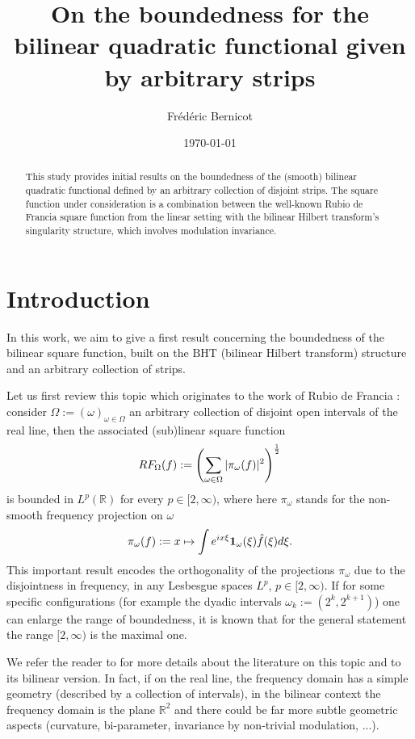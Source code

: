 \documentclass[a4paper,11pt,oneside]{amsart}
\title[On a bilinear square function built on a collection of strips]{On the boundedness for the bilinear quadratic functional given by arbitrary strips}
\author[F. Bernicot]{Fr\'ed\'eric Bernicot}
\date{\today}
\newcommand{\BHT}{{\textrm{BHT}}}
\theoremstyle{plain}
\theoremstyle{definition}
\begin{document}
\begin{abstract} This study provides initial results on the boundedness of the (smooth) bilinear quadratic functional defined by an arbitrary collection of disjoint strips. The square function under consideration is a combination between the well-known Rubio de Francia square function from the linear setting with the bilinear Hilbert transform's singularity structure, which involves modulation invariance.
\end{abstract}


\maketitle

\tableofcontents

\section{Introduction}

In this work, we aim to give a first result concerning the boundedness of the bilinear square function, built on the $\BHT$ (bilinear Hilbert transform) structure and an arbitrary collection of strips. 

Let us first review this topic which originates to the work of Rubio de Francia \cite{RF}: consider $\Omega:=(\omega)_{\omega\in\Omega}$ an arbitrary collection of disjoint open intervals of the real line, then the associated (sub)linear square function
$$ RF_{\Omega}(f):= \left(\sum_{\omega \in \Omega} |\pi_{\omega}(f)|^2 \right)^{1\over 2}$$
is bounded in $L^p({\mathbb R})$ for every $p\in [2,\infty)$,
where here $\pi_{\omega}$ stands for the non-smooth frequency projection on $\omega$
$$ \pi_{\omega}(f):= x \mapsto \int e^{ix\xi} {\bf 1}_{\omega}(\xi) \hat{f}(\xi) d\xi.$$ This important result encodes the orthogonality of the projections $\pi_{\omega}$ due to the disjointness in frequency, in any Lesbesgue spaces $L^p$, $p\in[2,\infty)$. If for some specific configurations (for example the dyadic intervals $\omega_k:=(2^k,2^{k+1})$) one can enlarge the range of boundedness, it is known that for the general statement the range $[2,\infty)$ is the maximal one.

We refer the reader to \cite{BB} for more details about the literature on this topic and to its bilinear version. In fact, if on the real line, the frequency domain has a simple geometry (described by a collection of intervals), in the bilinear context the frequency domain is the plane ${\mathbb R}^2$ and there could be far more subtle geometric aspects (curvature, bi-parameter, invariance by non-trivial modulation, ...).
\end{document}
